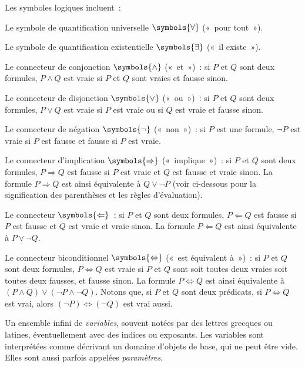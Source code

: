 \startsubsection[title=Symboles logiques]

Les symboles logiques incluent : 
\startitemize
  \item Le symbole de quantification universelle $\symbols{\forall}$ (« pour tout »).
  \item Le symbole de quantification existentielle $\symbols{\exists}$ (« il existe »).
  \item Le connecteur de conjonction $\symbols{\wedge}$ (« et ») : si $P$ et $Q$ sont deux formules, $P \wedge Q$ est vraie si $P$ et $Q$ sont vraies et fausse sinon.
  \item Le connecteur de disjonction $\symbols{\vee}$ (« ou ») : si $P$ et $Q$ sont deux formules, $P \vee Q$ est vraie si $P$ est vraie ou si $Q$ est vraie et fausse sinon.
  \item Le connecteur de négation $\symbols{\lnot}$ (« non ») : si $P$ est une formule, $\lnot P$ est vraie si $P$ est fausse et fausse si $P$ est vraie.
  \item Le connecteur d'implication $\symbols{\Rightarrow}$ (« implique ») : si $P$ et $Q$ sont deux formules, $P \Rightarrow Q$ est fausse si $P$ est vraie et $Q$ est fausse et vraie sinon.
  La formule $P \Rightarrow Q$ est ainsi équivalente à $Q \vee \lnot P$ (voir ci-dessous pour la signification des parenthèses et les règles d'évaluation).
  \item Le connecteur $\symbols{\Leftarrow}$ : si $P$ et $Q$ sont deux formules, $P \Leftarrow Q$ est fausse si $P$ est fausse et $Q$ est vraie et vraie sinon.
  La formule $P \Leftarrow Q$ est ainsi équivalente à $P \vee \lnot Q$.
  \item Le connecteur biconditionnel $\symbols{\Leftrightarrow}$ (« est équivalent à ») : si $P$ et $Q$ sont deux formules, $P \Leftrightarrow Q$ est vraie si $P$ et $Q$ sont soit toutes deux vraies soit toutes deux fausses, et fausse sinon.
  La formule $P \Leftrightarrow Q$ est ainsi équivalente à $(P \wedge Q) \vee (\lnot P \wedge \lnot Q)$.
      Notons que, si $P$ et $Q$ sont deux prédicats, si $P \Leftrightarrow Q$ est vrai, alors $(\lnot P) \Leftrightarrow (\lnot Q)$ est vrai aussi.
  \item Un ensemble infini de \emph{variables}, souvent notées par des lettres grecques ou latines, éventuellement avec des indices ou exposants. 
  Les variables sont interprétées comme décrivant un domaine d'objets de base, qui ne peut être vide. 
  Elles sont aussi parfois appelées \emph{paramètres}. 
\stopitemize

